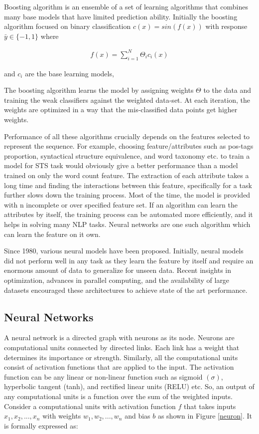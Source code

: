 \documentclass[12pt]{report} %
\begin{document}
Boosting algorithm is an ensemble of a set of learning algorithms that combines many base models that have limited prediction ability. Initially the boosting algorithm focused on binary classification $c(x)= sin(f(x))$ with response $\bar{y} \in \{-1,1\} $ where  

\begin{align}
f(x) =     \sum_{i=1}^{N} \varTheta_{i} c_{i}(x)
\end{align}

and $c_{i}$ are the base learning models,

The boosting algorithm learns the model by assigning weights $\varTheta$ to the data and training the weak classifiers against the weighted data-set. At each iteration, the weights are optimized in a way that the mis-classified data points get higher weights.

Performance of all these algorithms crucially depends on the features selected to represent the sequence. For example, choosing feature/attributes such as pos-tags proportion, syntactical structure equivalence, and word taxonomy etc. to train a model for STS task would obviously give a better performance than a model trained on only the word count feature. The extraction of each attribute takes a long time and finding the interactions between this feature, specifically for a task further slows down the training process. Most of the time, the model is provided with n incomplete or over specified feature set. If an algorithm can learn the attributes by itself, the training process can be automated more efficiently, and it helps in solving many NLP tasks. Neural networks are one such algorithm which can learn the feature on it own.

Since 1980, various neural models have been proposed. Initially, neural models did not perform well in any task as they learn the feature by itself and require an enormous amount of data to generalize for unseen data. Recent insights in optimization, advances in parallel computing, and the availability of large datasets encouraged these architectures to achieve state of the art performance. 


\subsection{Neural Networks}

A neural network is a directed graph with neurons as its node. Neurons are computational units connected by directed links. Each link has a weight that determines its importance or strength. Similarly, all the computational units consist of activation functions that are applied to the input. The activation function can be any linear or non-linear function such as sigmoid $(\sigma)$, hyperbolic tangent (tanh), and rectified linear units (RELU) etc. So, an output of any computational units is a function over the sum of the weighted inputs. Consider a computational units with activation function $f$ that takes inputs $x_{1},x_{2},...,x_{n}$ with weights $w_{1},w_{2},...,w_{n}$ and bias $b$ as shown in Figure \ref{neuron}. It is formally expressed as:
\end{document}
